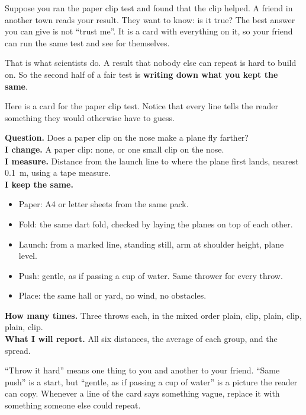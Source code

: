 \label{ch3}

Suppose you ran the paper clip test and found that the clip helped. A friend in another town reads your result. They want to know: is it true? The best answer you can give is not ``trust me''. It is a card with everything on it, so your friend can run the same test and see for themselves.

That is what scientists do. A result that nobody else can repeat is hard to build on. So the second half of a fair test is \textbf{writing down what you kept the same}.

Here is a card for the paper clip test. Notice that every line tells the reader something they would otherwise have to guess.

\begin{tcolorbox}[enhanced,colback=white,colframe=sky,boxrule=1.3pt,arc=2mm,left=8pt,right=8pt,top=5pt,bottom=5pt,before skip=7pt,after skip=7pt]
\sffamily\small
\textbf{Question.} Does a paper clip on the nose make a plane fly farther?\\[3pt]
\textbf{I change.} A paper clip: none, or one small clip on the nose.\\[3pt]
\textbf{I measure.} Distance from the launch line to where the plane first lands, nearest 0.1~m, using a tape measure.\\[3pt]
\textbf{I keep the same.}
\begin{itemize}[leftmargin=1.4em,itemsep=0pt,topsep=1pt]
\item Paper: A4 or letter sheets from the same pack.
\item Fold: the same dart fold, checked by laying the planes on top of each other.
\item Launch: from a marked line, standing still, arm at shoulder height, plane level.
\item Push: gentle, as if passing a cup of water. Same thrower for every throw.
\item Place: the same hall or yard, no wind, no obstacles.
\end{itemize}
\textbf{How many times.} Three throws each, in the mixed order plain, clip, plain, clip, plain, clip.\\[3pt]
\textbf{What I will report.} All six distances, the average of each group, and the spread.
\end{tcolorbox}

``Throw it hard'' means one thing to you and another to your friend. ``Same push'' is a start, but ``gentle, as if passing a cup of water'' is a picture the reader can copy. Whenever a line of the card says something vague, replace it with something someone else could repeat.

